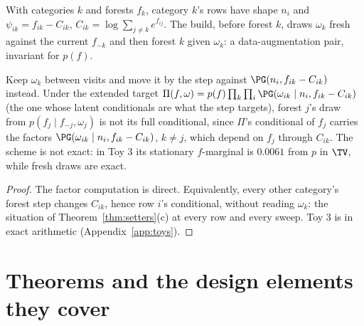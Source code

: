 With categories $k$ and forests $f_k$, category $k$'s rows have shape $n_i$ and $\psi_{ik}=f_{ik}-C_{ik}$,
$C_{ik}=\log\sum_{j\ne k}e^{f_{ij}}$. The build, before forest $k$, draws $\omega_k$ fresh against the current
$f_{-k}$ and then forest $k$ given $\omega_k$: a data-augmentation pair, invariant for $p(f)$.

\begin{theorem}\label{thm:multi}
Keep $\omega_k$ between visits and move it by the step against $\PG(n_i,f_{ik}-C_{ik})$ instead. Under the
extended target $\Pi(f,\omega)=p(f)\prod_k\prod_i\PG(\omega_{ik}\mid n_i,f_{ik}-C_{ik})$ (the one whose latent
conditionals are what the step targets), forest $j$'s draw from $p(f_j\mid f_{-j},\omega_j)$ is not its full
conditional, since $\Pi$'s conditional of $f_j$ carries the factors $\PG(\omega_{ik}\mid n_i,f_{ik}-C_{ik})$,
$k\ne j$, which depend on $f_j$ through $C_{ik}$. The scheme is not exact: in Toy 3 its stationary $f$-marginal is
$0.0061$ from $p$ in $\TV$, while fresh draws are exact.
\end{theorem}
\begin{proof}
The factor computation is direct. Equivalently, every other category's forest step changes $C_{ik}$, hence row
$i$'s conditional, without reading $\omega_k$: the situation of Theorem~\ref{thm:setters}(c) at every row and every
sweep. Toy 3 is in exact arithmetic (Appendix~\ref{app:toys}).
\end{proof}

\section{Theorems and the design elements they cover}\label{sec:map}

